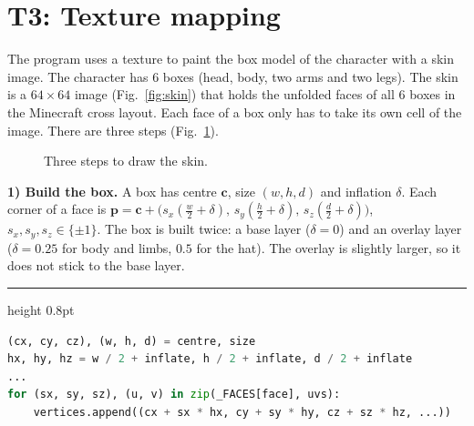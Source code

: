 \documentclass[9pt,twocolumn,a4paper]{extarticle}
\newenvironment{codebox}{\par\vspace{5pt}\noindent\begin{minipage}{\columnwidth}\hrule height 0.8pt\vspace{2pt}}{\end{minipage}\par\vspace{5pt}\noindent\ignorespaces}
\newcommand{\code}[1]{\texttt{#1}}
\begin{document}
\section{T3: Texture mapping}
\label{chap:t3}
The program uses a texture to paint the box model of the character with a skin image. The character has 6 boxes (head, body, two arms and two legs). The skin is a $64\times64$ image (Fig.~\ref{fig:skin}) that holds the unfolded faces of all 6 boxes in the Minecraft cross layout. Each face of a box only has to take its own cell of the image. There are three steps (Fig.~\ref{fig:skinflow}).

\begin{figure}[H]
\centering
{}
\caption{Three steps to draw the skin.}
\label{fig:skinflow}
\end{figure}

\textbf{1) Build the box.} A box has centre $\mathbf{c}$, size $(w,h,d)$ and inflation $\delta$. Each corner of a face is
$\mathbf{p}=\mathbf{c}+\big(s_x(\tfrac w2+\delta),\,s_y(\tfrac h2+\delta),\,s_z(\tfrac d2+\delta)\big)$, $s_x,s_y,s_z\in\{\pm1\}$.
The box is built twice: a base layer ($\delta=0$) and an overlay layer ($\delta=0.25$ for body and limbs, $0.5$ for the hat). The overlay is slightly larger, so it does not stick to the base layer.

\begin{codebox}
\begin{lstlisting}[language=Python,caption={\code{render/avatar\_renderer.py}, \code{\_box}: corner $\mathbf{p}$ of a face},label={lst:boxcorner}]
(cx, cy, cz), (w, h, d) = centre, size
hx, hy, hz = w / 2 + inflate, h / 2 + inflate, d / 2 + inflate
...
for (sx, sy, sz), (u, v) in zip(_FACES[face], uvs):
    vertices.append((cx + sx * hx, cy + sy * hy, cz + sz * hz, ...))
\end{lstlisting}
\end{codebox}
\end{document}

